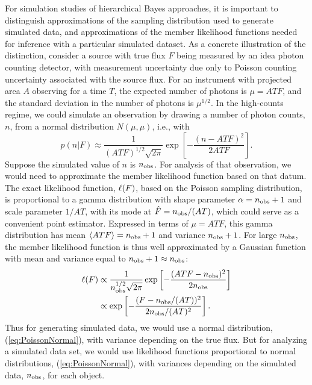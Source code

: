 For simulation studies of hierarchical Bayes approaches, it is important to distinguish approximations of the sampling distribution used to generate simulated data, and approximations of the member likelihood functions needed for inference with a particular simulated dataset.
As a concrete illustration of the distinction, consider a source with true flux $F$ being measured by an idea photon counting detector, with measurement uncertainty due only to Poisson counting uncertainty associated with the source flux.
For an instrument with projected area $A$ observing for a time $T$, the expected number of photons is $\mu = ATF$, and the standard deviation in the number of photons is $\mu^{1/2}$.
In the high-counts regime, we could simulate an observation by drawing a number of photon counts, $n$, from a normal distribution $N(\mu,\mu)$, i.e., with
\begin{equation}\label{eq:PoissonNormal}
p(n|F) \approx \frac{1}{(ATF)^{1/2}\sqrt{2\pi}}
  \exp\left[-\frac{(n-ATF)^2}{2ATF}\right].
\end{equation}
Suppose the simulated value of $n$ is $n_{\rm obs}$.
For analysis of that observation, we would need to approximate the member likelihood function based on that datum.
The exact likelihood function, $\ell(F)$, based on the Poisson sampling distribution, is proportional to a gamma distribution with shape parameter $\alpha = n_{\rm obs} + 1$ and scale parameter $1/AT$, with its mode at $\hat{F} = n_{\rm obs}/(AT)$, which could serve as a convenient point estimator.
Expressed in terms of $\mu = ATF$, this gamma distribution has mean $\langle ATF\rangle = n_{\rm obs} + 1$ and variance $n_{\rm obs} + 1$.
For large $n_{\rm obs}$, the member likelihood function is thus well approximated by a Gaussian function with mean and variance equal to $n_{\rm obs}+ 1 \approx n_{\rm obs}$:
\begin{align}\label{eq:GammaNormal}
\ell(F) 
  &\propto \frac{1}{n_{\rm obs}^{1/2}\sqrt{2\pi}}
     \exp\left[-\frac{(ATF - n_{\rm obs})^2}{2n_{\rm obs}}\right]\nonumber\\
  &\propto \exp\left[-\frac{(F - n_{\rm obs}/(AT))^2}
     {2n_{\rm obs}/(AT)^2}\right].
\end{align}
Thus for generating simulated data, we would use a normal distribution, (\ref{eq:PoissonNormal}), with variance depending on the true flux.
But for analyzing a simulated data set, we would use likelihood functions proportional to normal distributions, 
(\ref{eq:PoissonNormal}), with variances depending on the simulated data, $n_{\rm obs}$, for each object.

